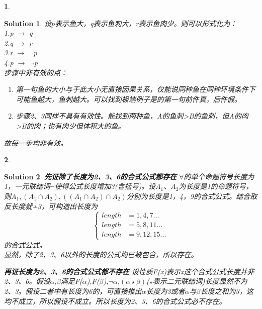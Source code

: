 \documentclass[UTF8,10pt,a4paper]{article}
\theoremstyle{Problem}
\newtheorem{prob}{}
\theoremstyle{Solution}
\newtheorem*{sol}{Solution}
\begin{document}
	\thispagestyle{FirstPageStyle}
	
	\begin{prob}
		
	\end{prob}
	
	\begin{sol} 
	设$p$表示鱼大，q表示鱼刺大，r表示鱼肉少。则可以形式化为：\\
	1.p $\rightarrow$ q\\
	2.q $\rightarrow$ r\\
	3.r $\rightarrow$ $\neg$p\\
	4.p $\rightarrow$ $\neg$p\\
	步骤中非有效的点：
	\begin{enumerate}
		\item 第一句鱼的大小与于此大小无直接因果关系，仅能说同种鱼在同种环境条件下可能鱼越大，鱼刺越大。可以找到极端例子是的第一句前件真，后件假。
		\item 步骤2、3同样不具有有效性。能找到两种鱼，A的鱼刺\textgreater B的鱼刺，但A的肉\textgreater B的肉；也有肉少但体积大的鱼。
	\end{enumerate}
	故每一步均非有效。
	\end{sol}
	
	\begin{prob}
		
	\end{prob}
	
	\begin{sol} 
		{\bf 先证除了长度为2、3、6的合式公式都存在} $\forall$的单个命题符号长度为1，一元联结词$\neg$使得公式长度增加3(含括号)。设$A_1$、$A_2$为长度是1的命题符号，则$A_1,(A_1 \cap A_2),((A_1 \cap A_2) \cap A_2)$分别为长度是1，4，9的合式公式。结合取反长度就+3，可构造出长度为
		\begin{equation}
			\left\{
			\begin{aligned}
					length&=1,4,7...\\
					length&=5,8,11...\\
					length&=9,12,15...
			\end{aligned}
			\right.
			\end{equation}的合式公式。\\
		显然，除了2、3、6以外的长度的公式均已被包含，所以存在。
		
		{\bf 再证长度为2、3、6的合式公式都不存在} 设性质F(x)表示x这个合式公式长度并非2、3、6。假设$\alpha$,$\beta$满足F($\alpha$),F($\beta$),$\neg\alpha$,$(\alpha \star \beta)$($\star$表示二元联结词)长度显然不为2、3。假设二者中有长度为6的，可直接推出$\alpha$长度为3或者$\alpha$与$\beta$长度之和为3，这均不成立，所以假设不成立。所以长度为2、3、6的合式公式必不存在。
	\end{sol}
	
\end{document}
